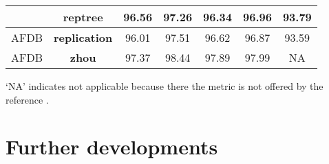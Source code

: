 \begin{table}[h]
\begin{center}
\begin{threeparttable}
\begin{tabular}{c c c c c c c}
  & reptree & 96.56 & 97.26 & 96.34 & 96.96 & 93.79 \\
  \hline
  AFDB & \textbf{replication} & 96.01 & 97.51 & 96.62 & 96.87 & 93.59 \\
  \hline
  AFDB & \textbf{zhou} & 97.37 & 98.44 & 97.89 & 97.99 & NA \\
  \bottomrule
\end{tabular}
\begin{tablenotes}
 	\item ‘NA’ indicates not applicable because there the metric is not offered by the reference \cite{zhou2015}.
    \end{tablenotes}
\end{threeparttable}
\end{center}
\end{table}

\section{Further developments}